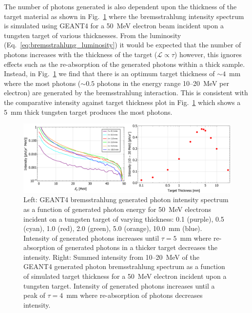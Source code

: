 \documentclass[../main.tex]{subfiles}
\begin{document}
The number of photons generated is also dependent upon the thickness of the target material as shown in Fig.~\ref{fig:bremsstrahlung_target_thickness} where the bremsstrahlung intensity spectrum is simulated using \textsc{GEANT4} \cite{agostinelli2003geant4} for a 50~\si{\mega\electronvolt} electron beam incident upon a tungsten target of various thicknesses. From the luminosity  (Eq.~\ref{eq:bremsstrahlung_luminosity}) it would be expected that the number of photons increases  with the thickness of the target ($\mathcal{L} \propto \tau$) however, this ignores effects such as the re-absorption of the generated photons within a thick sample. Instead, in Fig.~\ref{fig:bremsstrahlung_target_thickness} we find that there is an optimum target thickness of $\sim 4$~\si{\milli\meter} where the most photons ($\sim 0.5$ photons in the energy range 10--20~\si{\mega\electronvolt} per electron) are generated by the bremsstrahlung interaction. This is consistent with the comparative intensity against target thickness plot in Fig.~\ref{fig:bremsstrahlung_target_thickness} which shows a 5~\si{\milli\meter} thick tungsten target produces the most photons.  
\begin{figure}[!h]
\centering
\includegraphics[width=\textwidth]{Figures/DIANA_Inverse_Compton_Source_Design/brem_thickness_studies.pdf}
\caption{Left: \textsc{GEANT4} bremsstrahlung generated photon intensity spectrum as a function of generated photon energy for 50~\si{\mega\electronvolt} electrons incident on a tungsten target of varying thickness: 0.1 (purple), 0.5 (cyan), 1.0 (red), 2.0 (green), 5.0 (orange), 10.0~\si{\milli\meter} (blue). Intensity of generated photons increases until $\tau = 5$~\si{\milli\meter} where re-absorption of generated photons in a thicker target decreases the intensity. Right: Summed intensity from 10--20~\si{\mega\electronvolt} of the \textsc{GEANT4} generated photon bremsstrahlung spectrum as a function of simulated target thickness for a 50~\si{\mega\electronvolt} electron incident upon a tungsten target. Intensity of generated photons increases until a peak of $\tau = 4$~\si{\milli\meter} where re-absorption of photons decreases intensity.}
\label{fig:bremsstrahlung_target_thickness}
\end{figure}
\end{document}

